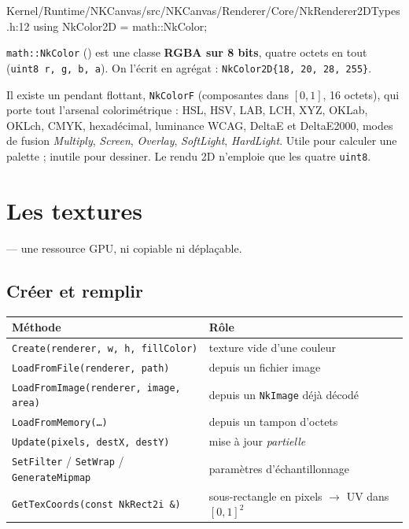 \begin{nkcode}{Kernel/Runtime/NKCanvas/src/NKCanvas/Renderer/Core/NkRenderer2DTypes.h:12}
using NkColor2D = math::NkColor;
\end{nkcode}

\texttt{math::NkColor}
() est une classe
\textbf{RGBA sur 8 bits}, quatre octets en tout (\texttt{uint8 r, g, b, a}). On
l'écrit en agrégat : \texttt{NkColor2D\{18, 20, 28, 255\}}.

Il existe un pendant flottant, \texttt{NkColorF} (composantes dans $[0,1]$, 16
octets), qui porte tout l'arsenal colorimétrique : HSL, HSV, LAB, LCH, XYZ,
OKLab, OKLch, CMYK, hexadécimal, luminance WCAG, DeltaE et DeltaE2000, modes de
fusion \emph{Multiply}, \emph{Screen}, \emph{Overlay}, \emph{SoftLight},
\emph{HardLight}. Utile pour calculer une palette ; inutile pour dessiner. Le
rendu 2D n'emploie que les quatre \texttt{uint8}.

\section{Les textures}

 — une ressource GPU, ni copiable
ni déplaçable.

\subsection{Créer et remplir}

\begin{center}
\begin{tabular}{@{}ll@{}}
\toprule
\textbf{Méthode} & \textbf{Rôle} \\
\midrule
\texttt{Create(renderer, w, h, fillColor)}      & texture vide d'une couleur \\
\texttt{LoadFromFile(renderer, path)}           & depuis un fichier image \\
\texttt{LoadFromImage(renderer, image, area)}   & depuis un \texttt{NkImage} déjà décodé \\
\texttt{LoadFromMemory(\dots)}                  & depuis un tampon d'octets \\
\texttt{Update(pixels, destX, destY)}           & mise à jour \emph{partielle} \\
\texttt{SetFilter} / \texttt{SetWrap} / \texttt{GenerateMipmap} & paramètres d'échantillonnage \\
\texttt{GetTexCoords(const NkRect2i \&)}        & sous-rectangle en pixels $\rightarrow$ UV dans $[0,1]^2$ \\
\bottomrule
\end{tabular}
\end{center}

